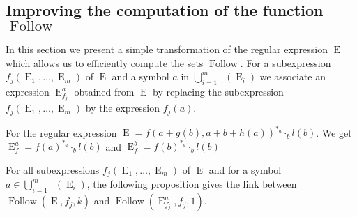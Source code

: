 \documentclass{llncs}
\DeclareMathOperator{\Follow}{Follow}
\DeclareMathOperator{\E}{E}
\DeclareMathOperator{\Firs}{Fr_0}
\def\firs#1{\Firs{(#1)}}
\begin{document}
\subsection{Improving the computation of the function $\Follow$}
In this section we present a simple transformation of the regular expression $\E$ which allows us to efficiently compute the sets $\Follow$. For a subexpression $f_j(\E_1,\ldots,\E_m)$ of $\E$ and a symbol $a$ in $\displaystyle \bigcup^m_{i=1}\firs{\E_i}$ we associate an expression $\E^a_{f_j}$ obtained from $\E$ by replacing the subexpression $f_j(\E_1,\ldots,\E_m)$ by the expression $f_j(a)$. 
\begin{example}    
For the regular expression $\E=f(a+g(b),a+b+h(a))^{*_a}\cdot_b l(b)$. We get $\E^a_f=f(a)^{*_a}\cdot_b l(b)$ and $\E^b_f=f(b)^{*_a}\cdot_b l(b)$
\end{example}
For all subexpressions $f_j(\E_1,\ldots,\E_m)$ of $\E$ and for a symbol $a\in\displaystyle \bigcup^m_{i=1}\firs{\E_i}$, the following proposition gives the link between $\Follow(\E,f_j,k)$ and $\Follow(\E^a_{f_j},f_j,1)$.  
\end{document}
